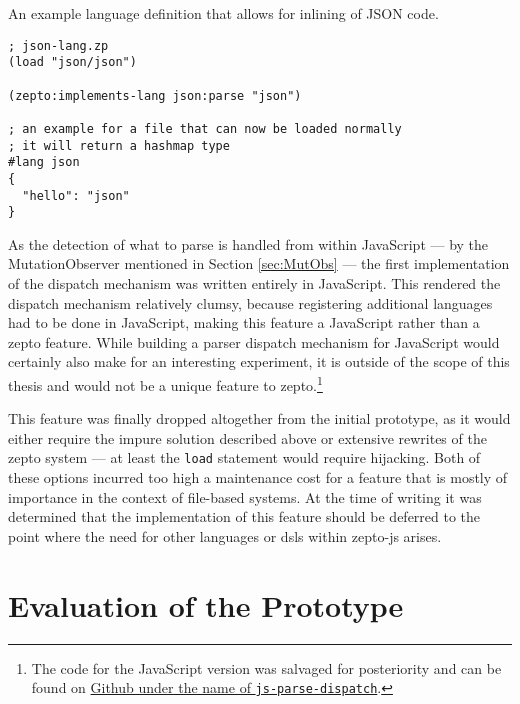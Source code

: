 \documentclass[oneside,11pt,xetex]{scrbook}
\begin{document}
\begin{listing}[H]
\caption{An example language definition that allows for inlining of JSON code.}
\begin{verbatim}
; json-lang.zp
(load "json/json")

(zepto:implements-lang json:parse "json")

; an example for a file that can now be loaded normally
; it will return a hashmap type
#lang json
{
  "hello": "json"
}
\end{verbatim}
\label{fig:json}
\end{listing}

As the detection of what to parse is handled from within JavaScript --- by the
MutationObserver mentioned in Section \ref{sec:MutObs} --- the first implementation
of the dispatch mechanism was written entirely in JavaScript. This rendered
the dispatch mechanism relatively clumsy, because registering
additional languages had to be done in JavaScript, making this feature
a JavaScript rather than a zepto feature. While building a parser dispatch
mechanism for JavaScript would certainly also make for an interesting experiment,
it is outside  of the scope of this thesis and would not be a unique feature
to zepto.\footnote{The code for the JavaScript version was salvaged for posteriority
and can be found on \href{https://github.com/hellerve/js-parse-dispatch}{Github under
the name of \texttt{js-parse-dispatch}}.}

This feature was finally dropped altogether from the initial prototype,
as it would either require the impure solution described above or extensive rewrites
of the zepto system --- at least the \texttt{load} statement would require hijacking.
Both of these options incurred too high a maintenance cost for a feature that is
mostly of importance in the context of file-based systems. At the time of writing it
was determined that the implementation of this feature should be deferred to the point
where the need for other languages or \glspl{dsl} within zepto-js arises.

\chapter{Evaluation of the Prototype}
\label{chap:evaluation}
\end{document}
